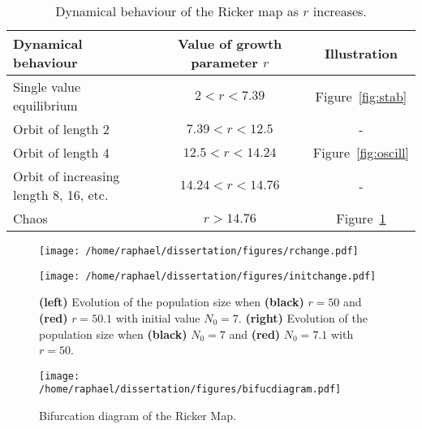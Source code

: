 \documentclass[12pt]{article}
\newcommand{\ra}[1]{\renewcommand{\arraystretch}{#1}}
\begin{document}
	\begin{table}[htb]
		\centering
		\vspace{15mm}
		\ra{1.3}
		\begin{tabular}{@{}lcc@{}} \toprule
			Dynamical behaviour & Value of growth parameter $r$ &  Illustration \\ \midrule
			Single value equilibrium & $2<r<7.39$ & Figure~\ref{fig:stab}\\ 
			Orbit of length 2 & $7.39<r<12.5$ & - \\ 
			Orbit of length 4 & $12.5<r<14.24$ & Figure~\ref{fig:oscill}\\ 
			Orbit of increasing length 8, 16, etc. & $14.24<r<14.76$ & - \\ 
			Chaos &  $r>14.76$ &  Figure~\ref{fig:chaos} \\ \bottomrule
		\end{tabular}
		\caption{Dynamical behaviour of the Ricker map as $r$ increases.}
		\label{valuesr}
		\vspace{5mm}
	\end{table}	
	
	\begin{figure}[htb]
		\centering
		\begin{minipage}{0.49\textwidth}
			\centering
			\texttt{[image: /home/raphael/dissertation/figures/rchange.pdf]}
		\end{minipage}
		\begin{minipage}{0.49\textwidth}
			\centering
			\texttt{[image: /home/raphael/dissertation/figures/initchange.pdf]}
		\end{minipage}
		\caption[Examples of the chaotic behaviour of the Ricker map.]{\textbf{(left)} Evolution of the population size when \textbf{(black)} $r=50$ and \textbf{(red)} $r=50.1$ with initial value $N_0=7$. \textbf{(right)} Evolution of the population size when \textbf{(black)} $N_0=7$ and \textbf{(red)} $N_0=7.1$ with $r=50$.}
		\label{fig:chaos}
	\end{figure}

	\begin{figure}[htb]
		\centering
		\begin{minipage}{0.9\textwidth}
			\centering
			\texttt{[image: /home/raphael/dissertation/figures/bifucdiagram.pdf]}
		\end{minipage}
		\caption{Bifurcation diagram of the Ricker Map.}
		\label{fig:stability}
	\end{figure}
	
\end{document}
